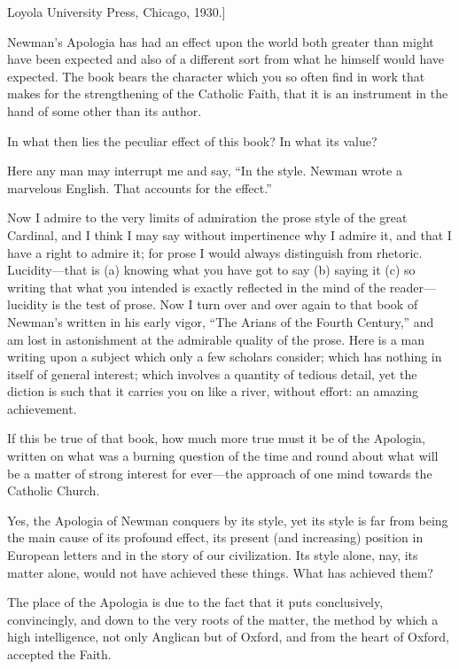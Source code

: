 Loyola University Press, Chicago, 1930.]

Newman's Apologia has had an effect upon the
world both greater than might have been expected and also of a different
sort from what he himself would have expected. The book bears the
character which you so often find in work that makes for the
strengthening of the Catholic Faith, that it is an instrument in the
hand of some other than its author.

In what then lies the peculiar effect of this book?
In what its value?

Here any man may interrupt me and say, ``In the
style. Newman wrote a marvelous English. That accounts for the effect.''

Now I admire to the very limits of admiration the
prose style of the great Cardinal, and I think I may say without
impertinence why I admire it, and that I have a right to admire it; for
prose I would always distinguish from rhetoric. Lucidity—that is (a)
knowing what you have got to say (b) saying it (c) so writing that what
you intended is exactly reflected in the mind of the reader—lucidity
is the test of prose. Now I turn over and over again to that book of
Newman's written in his early vigor, ``The Arians of the Fourth
Century,'' and am lost in astonishment at the admirable quality of
the prose. Here is a man writing upon a subject which only a few
scholars consider; which has nothing in itself of general interest;
which involves a quantity of tedious detail, yet the diction is such
that it carries you on like a river, without effort: an amazing
achievement.

If this be true of that book, how much more true
must it be of the Apologia, written on what was a burning question of
the time and round about what will be a matter of strong interest for
ever—the approach of one mind towards the Catholic Church.

Yes, the Apologia of Newman conquers by its style,
yet its style is far from being the main cause of its profound effect,
its present (and increasing) position in European letters and in the
story of our civilization. Its style alone, nay, its matter alone, would not have achieved these things. What has achieved them?

The place of the Apologia is due to the fact that
it puts conclusively, convincingly, and down to the very roots of the
matter, the method by which a high intelligence, not only Anglican but
of Oxford, and from the heart of Oxford, accepted the Faith.

